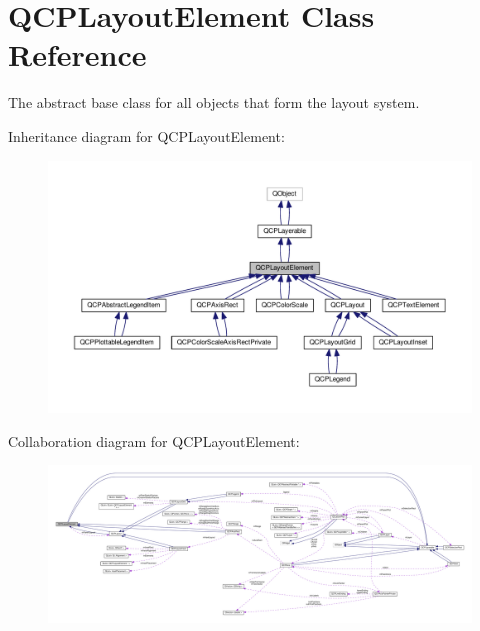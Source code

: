 \hypertarget{class_q_c_p_layout_element}{}\section{Q\+C\+P\+Layout\+Element Class Reference}
\label{class_q_c_p_layout_element}


The abstract base class for all objects that form the layout system.  




Inheritance diagram for Q\+C\+P\+Layout\+Element\+:\nopagebreak
\begin{figure}[H]
\begin{center}
\leavevmode
\includegraphics[width=350pt]{class_q_c_p_layout_element__inherit__graph}
\end{center}
\end{figure}


Collaboration diagram for Q\+C\+P\+Layout\+Element\+:\nopagebreak
\begin{figure}[H]
\begin{center}
\leavevmode
\includegraphics[width=350pt]{class_q_c_p_layout_element__coll__graph}
\end{center}
\end{figure}
